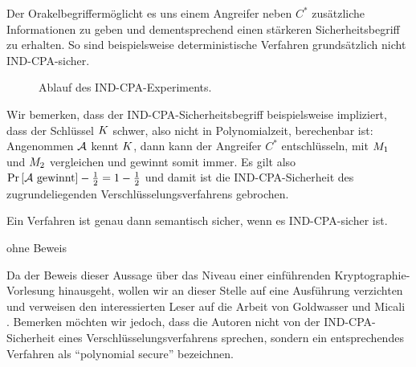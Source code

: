 Der Orakelbegriff\indexOracle ermöglicht es uns einem Angreifer neben
$C^{\ast}$ zusätzliche Informationen zu geben und dementsprechend einen
stärkeren Sicherheitsbegriff zu erhalten. So sind beispielsweise
deterministische Verfahren grundsätzlich nicht IND-CPA-sicher.
\begin{figure}[h] \centering {}
  \caption{Ablauf des IND-CPA-Experiments.}
  \label{fig:ind-cpa}
\end{figure} Wir bemerken, dass der IND-CPA-Sicherheitsbegriff
beispielsweise impliziert, dass der Schlüssel $K$ schwer, also nicht
in Polynomialzeit, berechenbar ist: Angenommen $\mathcal{A}$ kennt $K$, dann
kann der Angreifer $C^{\ast}$ entschlüsseln, mit $M_1$ und
$M_2$ vergleichen und gewinnt somit immer. Es gilt also $\Pr
\left[ \mathcal{A} \textnormal{ gewinnt} \right] - \frac{1}{2} = 1 - \frac{1}{2}$
und damit ist die IND-CPA-Sicherheit des zugrundeliegenden
Verschlüsselungsverfahrens gebrochen.

\begin{theorem} Ein Verfahren ist genau dann semantisch sicher, wenn es
  IND-CPA-sicher ist.
\end{theorem}
\begin{beweis} ohne Beweis
\end{beweis} Da der Beweis dieser Aussage über das Niveau einer
einführenden Kryptographie-Vorlesung hinausgeht, wollen wir an dieser
Stelle auf eine Ausführung verzichten und verweisen den interessierten
Leser auf die Arbeit von Goldwasser und Micali
\cite{Goldwasser1984}. Bemerken möchten wir jedoch, dass die Autoren
nicht von der IND-CPA-Sicherheit eines Verschlüsselungsverfahrens
sprechen, sondern ein entsprechendes Verfahren als "`polynomial secure"'
bezeichnen.

